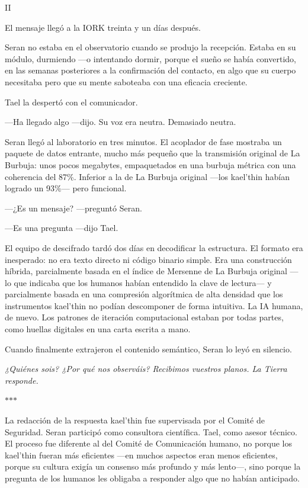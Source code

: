 \documentclass[11pt,a5paper,twoside]{book}
\begin{document}
II

El mensaje llegó a la IORK treinta y un días después.

Seran no estaba en el observatorio cuando se produjo la recepción. Estaba en su módulo, durmiendo —o intentando dormir, porque el sueño se había convertido, en las semanas posteriores a la confirmación del contacto, en algo que su cuerpo necesitaba pero que su mente saboteaba con una eficacia creciente.

Tael la despertó con el comunicador.

—Ha llegado algo —dijo. Su voz era neutra. Demasiado neutra.

Seran llegó al laboratorio en tres minutos. El acoplador de fase mostraba un paquete de datos entrante, mucho más pequeño que la transmisión original de La Burbuja: unos pocos megabytes, empaquetados en una burbuja métrica con una coherencia del 87\%. Inferior a la de La Burbuja original —los kael'thin habían logrado un 93\%— pero funcional.

—¿Es un mensaje? —preguntó Seran.

—Es una pregunta —dijo Tael.

El equipo de descifrado tardó dos días en decodificar la estructura. El formato era inesperado: no era texto directo ni código binario simple. Era una construcción híbrida, parcialmente basada en el índice de Mersenne de La Burbuja original —lo que indicaba que los humanos habían entendido la clave de lectura— y parcialmente basada en una compresión algorítmica de alta densidad que los instrumentos kael'thin no podían descomponer de forma intuitiva. La IA humana, de nuevo. Los patrones de iteración computacional estaban por todas partes, como huellas digitales en una carta escrita a mano.

Cuando finalmente extrajeron el contenido semántico, Seran lo leyó en silencio.

\textit{¿Quiénes sois? ¿Por qué nos observáis? Recibimos vuestros planos. La Tierra responde.}

\vspace{1.5em}
\begin{center}$\ast$\quad$\ast$\quad$\ast$\end{center}
\vspace{1.5em}

La redacción de la respuesta kael'thin fue supervisada por el Comité de Seguridad. Seran participó como consultora científica. Tael, como asesor técnico. El proceso fue diferente al del Comité de Comunicación humano, no porque los kael'thin fueran más eficientes —en muchos aspectos eran menos eficientes, porque su cultura exigía un consenso más profundo y más lento—, sino porque la pregunta de los humanos les obligaba a responder algo que no habían anticipado.
\end{document}
